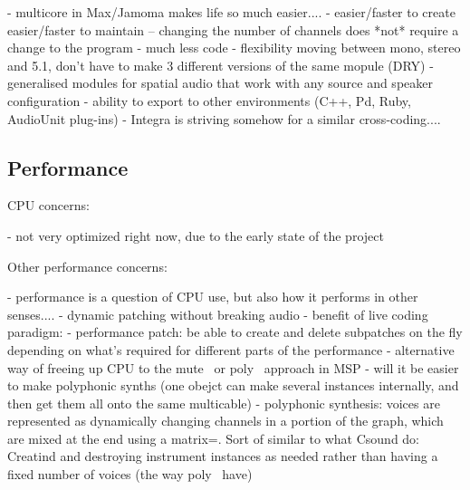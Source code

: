 \documentclass[twoside,a4paper]{article}
\begin{document}

- multicore in Max/Jamoma makes life so much easier....
- easier/faster to create easier/faster to maintain -- changing the number of channels does *not* require a change to the program
- much less code
- flexibility moving between mono, stereo and 5.1, don't have to make 3 different versions of the same mopule (DRY)
- generalised modules for spatial audio that work with any source and speaker configuration
- ability to export to other environments (C++, Pd, Ruby, AudioUnit plug-ins)
- Integra is striving somehow for a similar cross-coding....



\subsection{Performance} %

CPU concerns:

- not very optimized right now, due to the early state of the project

 
Other performance concerns:

- performance is a question of CPU use, but also how it performs in other senses....
- dynamic patching without breaking audio
- benefit of live coding paradigm:
    - performance patch: be able to create and delete subpatches on the fly depending on what's required for different parts of the performance
    - alternative way of freeing up CPU to the mute~ or poly~ approach in MSP
    - will it be easier to make polyphonic synths (one obejct can make several instances internally, and then get them all onto the same multicable)
    - polyphonic synthesis: voices are represented as dynamically changing channels in a portion of the graph, which are mixed at the end using a matrix=. Sort of similar to what Csound do: Creatind and destroying instrument instances as needed rather than having a fixed number of voices (the way poly~ have)

%
\end{document}
